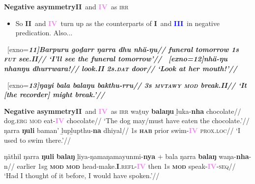 \documentclass[dvipsnames]{beamer}%
\newcommand{\I}{\textbf{\textcolor{forest}{I}}}
\newcommand{\II}{\textbf{\textcolor{ochre}{II}}}
\newcommand{\III}{\textbf{\textcolor{blue}{III}}}
\newcommand{\IV}{\textbf{\textcolor{violet}{IV}}}
\begin{document}
\begin{frame}{\textbf{Negative asymmetry}\hfill\II~and \IV~as \textsc{irr}}
	
\begin{itemize}
	\item So \II~and \IV~turn up as the counterparts of \I~and \III~in negative predication. Also...
\end{itemize}	
	
	\pause
\ex~[exno=\bf\it11]\begingl\gla{}Barpuru goḏarr ŋarra \textbf{dhu} nhä-\textbf{ŋu}//
\glb funeral tomorrow 1s \textsc{\textbf{fut}} see.\II//
\glft `I'll see the funeral tomorrow'//\endgl
\xe
\pause
\ex~[exno=\bf\it 12]\begingl\gla{}nhä-\textbf{ŋu} nhanŋu dhurrwara!//
\glb look.{\II} 2s.\textsc{dat} door//
\glft`Look at her mouth!'//\endgl
\xe
\pause

\ex~[exno=\bf\it13]\begingl\gla\rightcomment{\textcolor{ochre}{\textsc{[circ]}}}ŋayi bala \textbf{balaŋu} bakthu-\textbf{rru}//
\glb 3s \textsc{mvtawy} \textsc{\textbf{mod}} break{.\II}//
\glft`It [the recorder] might break.'//\endgl\xe

\end{frame}


\begin{frame}{\textbf{Negative asymmetry}\hfill\II~and \IV~as \textsc{irr}}
%
\ex[exno=\bf\it14]\begingl\gla\rightcomment{\textcolor{violet}{\textsc{[circ]}}}waṯuy \textbf{balaŋu} ḻuka-\textbf{nha} chocolate//
\glb dog.\textsc{erg} \textsc{mod} eat-{\IV} chocolate//
\glft`The dog may/must have eaten the chocolate.'//\endgl\xe
%
\ex[exno=\bf\it15]\begingl\gla{}ŋarra \textbf{ŋuli} baman' ḻupḻupthu-\textbf{na} dhiyal//
	\glb 1s \textsc{\textbf{hab}} prior swim-{\IV} \textsc{prox.loc}//
	\glft`I used to swim there.'//\endgl\xe

\ex[exno=\bf\it16]\begingl\gla{}ŋäthil ŋarra \textbf{ŋuli} \textbf{balaŋ} ḻiya-ŋamaŋamayunmi-\textbf{nya} + bala ŋarra \textbf{balaŋ} waŋa-\textbf{nha}-n//
\glb earlier 1sg \textbf{\textsc{mod}} \textbf{\textsc{mod}} head-make.\I.\textsc{refl}-\IV{} then 1s \textsc{\textbf{mod}} speak-\IV-\textsc{seq}//
\glft`Had I thought of it before, I would have spoken.'//\endgl
\xe 

%
%
\end{frame}
\end{document}
